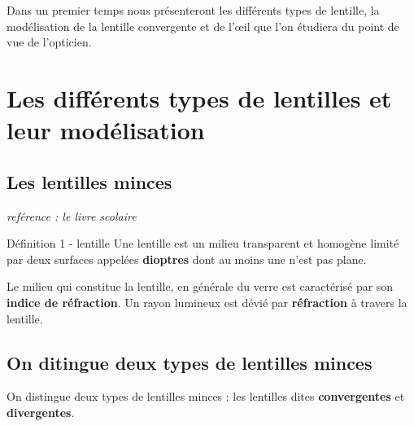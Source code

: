 \documentclass[french, a4paper, 12pt]{article}
\begin{document}
Dans un premier temps nous présenteront les différents types de lentille, la modélisation de la lentille convergente et de l'\oe il que l'on étudiera du point de vue de l'opticien.
\section{Les différents types de lentilles et leur modélisation}

\subsection{Les lentilles minces}

\begin{center}
	\textit{reférence : le livre scolaire}
\end{center}

\begin{definition}{Définition 1 - lentille}
	Une lentille est un milieu transparent et homogène limité par deux surfaces appelées \textbf{dioptres} dont au moins une n'est pas plane.
\end{definition}

Le milieu qui constitue la lentille, en générale du verre est caractérisé par son \textbf{indice de réfraction}. Un rayon lumineux est dévié par \textbf{réfraction} à travers la lentille.

\subsection{On ditingue deux types de lentilles minces}

On distingue deux types de lentilles minces : les lentilles dites \textbf{convergentes} et \textbf{divergentes}.\medskip
\end{document}
